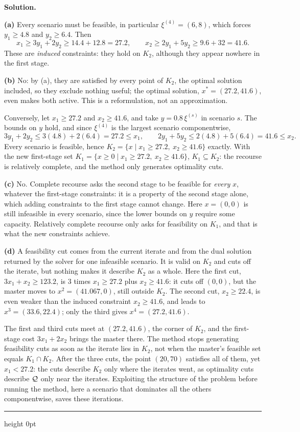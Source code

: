 \documentclass[11pt]{article}
\newenvironment{solution}
    {\par\nobreak\smallskip\noindent\textbf{Solution.}\par\nobreak\smallskip}
    {\par\medskip\hrule height 0pt\medskip}
\begin{document}
\begin{solution}
\textbf{(a)} Every scenario must be feasible, in particular $\xi^{(4)} = (6, 8)$,
which forces $y_1 \geq 4.8$ and $y_2 \geq 6.4$. Then
\[
x_1 \geq 3y_1 + 2y_2 \geq 14.4 + 12.8 = 27.2, \qquad
x_2 \geq 2y_1 + 5y_2 \geq 9.6 + 32 = 41.6 .
\]
These are \emph{induced} constraints: they hold on $K_2$, although they appear
nowhere in the first stage.

\textbf{(b)} No: by (a), they are satisfied by every point of $K_2$, the optimal
solution included, so they exclude nothing useful; the optimal solution,
$x^* = (27.2, 41.6)$, even makes both active. This is a reformulation, not an
approximation.

Conversely, let $x_1 \geq 27.2$ and $x_2 \geq 41.6$, and take
$y = 0.8\,\xi^{(s)}$ in scenario $s$. The bounds on $y$ hold, and since
$\xi^{(4)}$ is the largest scenario componentwise,
\[
3y_1 + 2y_2 \leq 3(4.8) + 2(6.4) = 27.2 \leq x_1, \qquad
2y_1 + 5y_2 \leq 2(4.8) + 5(6.4) = 41.6 \leq x_2 .
\]
Every scenario is feasible, hence
$K_2 = \lbrace x \mid x_1 \geq 27.2,\ x_2 \geq 41.6 \rbrace$ exactly. With the new
first-stage set $K_1 = \lbrace x \geq 0 \mid x_1 \geq 27.2,\ x_2 \geq 41.6 \rbrace$,
$K_1 \subseteq K_2$: the recourse is relatively complete, and the method only
generates optimality cuts.

\textbf{(c)} No. Complete recourse asks the second stage to be feasible for
\emph{every} $x$, whatever the first-stage constraints: it is a property of the
second stage alone, which adding constraints to the first stage cannot change.
Here $x = (0, 0)$ is still infeasible in every scenario, since the lower bounds on
$y$ require some capacity. Relatively complete recourse only asks for
feasibility on $K_1$, and that is what the new constraints achieve.

\textbf{(d)} A feasibility cut comes from the current iterate and from the dual
solution returned by the solver for one infeasible scenario. It is valid on
$K_2$ and cuts off the iterate, but nothing makes it describe $K_2$ as a whole.
Here the first cut, $3x_1 + x_2 \geq 123.2$, is $3$ times $x_1 \geq 27.2$ plus
$x_2 \geq 41.6$: it cuts off $(0, 0)$, but the master moves to
$x^2 = (41.067, 0)$, still outside $K_2$. The second cut,
$x_2 \geq 22.4$, is even weaker than the induced constraint $x_2 \geq 41.6$, and
leads to $x^3 = (33.6, 22.4)$; only the third gives $x^4 = (27.2, 41.6)$.

The first and third cuts meet at $(27.2, 41.6)$, the corner of $K_2$, and the
first-stage cost $3x_1 + 2x_2$ brings the master there. The method stops
generating feasibility cuts as soon as the iterate lies in $K_2$, not when the
master's feasible set equals $K_1 \cap K_2$. After the three cuts, the point
$(20, 70)$ satisfies all of them, yet $x_1 < 27.2$: the cuts
describe $K_2$ only where the iterates went, as optimality cuts describe ${\mathcal{Q}}$
only near the iterates. Exploiting the structure of the problem before running
the method, here a scenario that dominates all the others componentwise, saves
these iterations.
\end{solution}
\end{document}
